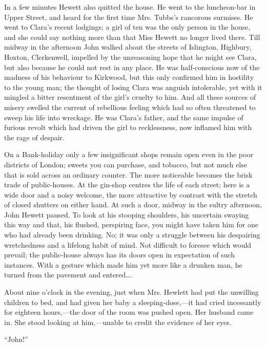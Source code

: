 In a few minutes Hewett also quitted the house. He went to the
luncheon-bar in Upper Street, and heard for the first time Mrs. Tubbs's
rancorous surmises. He went to Clara's recent lodgings; a girl of ten
was the only person in the house, and she could say nothing more than
that Miss Hewett no longer lived there. Till midway in the afternoon
John walked about the streets of Islington, Highbury, Hoxton,
Clerkenwell, impelled by the unreasoning hope that he might see Clara,
but also because he could not rest in any place. He was half-conscious
now of the madness of his behaviour to Kirkwood, but this only confirmed
him in hostility to the {\protect\hypertarget{289}{}{}}young man; the
thought of losing Clara was anguish intolerable, yet with it mingled a
bitter resentment of the girl's cruelty to him. And all these sources of
misery swelled the current of rebellious feeling which had so often
threatened to sweep his life into wreckage. He was Clara's father, and
the same impulse of furious revolt which had driven the girl to
recklessness, now inflamed him with the rage of despair.

On a Bank-holiday only a few insignificant shops remain open even in the
poor districts of London; sweets you can purchase, and tobacco, but not
much else that is sold across an ordinary counter. The more noticeable
becomes the brisk trade of public-houses. At the gin-shop centres the
life of each street; here is a wide door and a noisy welcome, the more
attractive by contrast with the stretch of closed shutters on either
hand. At such a door, midway in the sultry afternoon, John Hewett
paused. To look at his stooping shoulders, his uncertain swaying this
way and that, his flushed, perspiring face, you might
{\protect\hypertarget{290}{}{}}have taken him for one who had already
been drinking. No; it was only a struggle between his despairing
wretchedness and a lifelong habit of mind. Not difficult to foresee
which would prevail; the public-house always has its doors open in
expectation of such instances. With a gesture which made him yet more
like a drunken man, he turned from the pavement and entered\ldots{}.

About nine o'clock in the evening, just when Mrs. Hewlett had put the
unwilling children to bed, and had given her baby a sleeping-dose,---it
had cried incessantly for eighteen hours,---the door of the room was
pushed open. Her husband came in. She stood looking at him,---unable to
credit the evidence of her eyes.

``John!''

